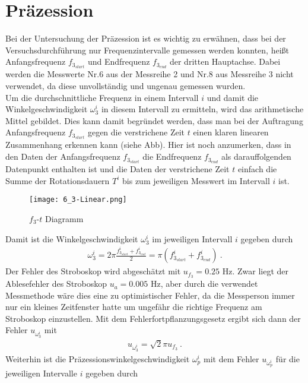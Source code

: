 

\section{Präzession}

Bei der Untersuchung der Präzession ist es wichtig zu erwähnen, dass bei der Versuchsdurchführung nur Frequenzintervalle gemessen werden konnten, heißt Anfangsfrequenz $f_{3_{start}}$ und Endfrequenz $f_{3_{end}}$ der dritten Hauptachse. Dabei werden die Messwerte Nr.6 aus der Messreihe 2 und Nr.8 aus Messreihe 3 nicht verwendet, da diese unvollständig und ungenau gemessen wurden. \\
Um die durchschnittliche Frequenz in einem Intervall $i$ und damit die Winkelgeschwindigkeit $\omega_3^i$ in diesem Intervall zu ermitteln, wird das arithmetische Mittel gebildet. Dies kann damit begründet werden, dass man bei der Auftragung Anfangsfrequenz $f_{3_{start}}$ gegen die verstrichene Zeit $t$ einen klaren linearen Zusammenhang erkennen kann (siehe Abb). Hier ist noch anzumerken, dass in den Daten der Anfangsfrequenz $f_{3_{start}}$ die Endfrequenz $f_{3_{end}}$ als darauffolgenden Datenpunkt enthalten ist und die Daten der verstrichene Zeit $t$ einfach die Summe der Rotationsdauern $T^i$ bis zum jeweiligen Messwert im Intervall $i$ ist.
\begin{figure}[ht]
    \centering
    \caption{$f_3$-$t$ Diagramm}
    \texttt{[image: 6\_3-Linear.png]}
\end{figure}
Damit ist die Winkelgeschwindigkeit $\omega_3^i$ im jeweiligen Intervall $i$ gegeben durch 
\begin{align}
    \omega_3^i=2\pi\frac{f_{3_{start}}^i+f_{3_{end}}^i}{2}=\pi(f_{3_{start}}^i+f_{3_{end}}^i)~.
\end{align}
Der Fehler des Stroboskop wird abgeschätzt mit $u_{f_3} = 0.25$ Hz. Zwar liegt der Ablesefehler des Stroboskop $u_a = 0.005$ Hz, aber durch die verwendet Messmethode wäre dies eine zu optimistischer Fehler, da die Messperson immer nur ein kleines Zeitfenster hatte um ungefähr die richtige Frequenz am Stroboskop einzustellen. Mit dem Fehlerfortpflanzungsgesetz ergibt sich dann der Fehler $u_{\omega_3^i}$ mit
\begin{align}
    u_{\omega_3^i}=\sqrt{2}\pi u_{f_3}~.
\end{align}
Weiterhin ist die Präzessionswinkelgeschwindigkeit $\omega_p^i$ mit dem Fehler $u_{\omega_p^i}$ für die jeweiligen Intervalle $i$ gegeben durch 
